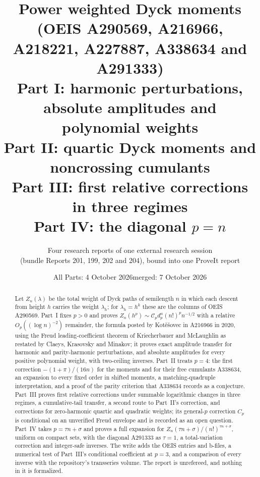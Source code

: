 \documentclass[11pt,letterpaper]{article}
\title{\LARGE\bfseries Power weighted Dyck moments\\[4pt]\large (OEIS A290569, A216966, A218221, A227887, A338634 and A291333)\\[8pt]
\normalsize Part I: harmonic perturbations, absolute amplitudes and polynomial weights\\[2pt]
Part II: quartic Dyck moments and noncrossing cumulants\\[2pt]
Part III: first relative corrections in three regimes\\[2pt]
Part IV: the diagonal $p=n$}
\author{Four research reports of one external research session\\(bundle Reports 201, 199, 202 and 204), bound into one ProveIt report}
\date{All Parts: 4 October 2026\quad merged: 7 October 2026}
\numberwithin{equation}{section}
\theoremstyle{remark}\newtheorem{remark}[theorem]{Remark}
\begin{document}
\hypersetup{pageanchor=false}
\maketitle
\begin{abstract}
Let $Z_n(\lambda)$ be the total weight of Dyck paths of semilength $n$ in which each descent from height $h$ carries the weight $\lambda_h$; for $\lambda_h=h^k$ these are the columns of OEIS A290569. Part~I fixes $p>0$ and proves $Z_n(h^p)\sim\mathcal C_pd_p^n(n!)^pn^{-1/2}$ with a relative $O_p((\log n)^{-2})$ remainder, the formula posted by Kot\v e\v sovec in A216966 in 2020, using the Freud leading-coefficient theorem of Kriecherbauer and McLaughlin as restated by Claeys, Krasovsky and Minakov; it proves exact amplitude transfer for harmonic and parity-harmonic perturbations, and absolute amplitudes for every positive polynomial weight, with two-ceiling inverses. Part~II treats $p=4$: the first correction $-(1+\pi)/(16n)$ for the moments and for their free cumulants A338634, an expansion to every fixed order in shifted moments, a matching-quadruple interpretation, and a proof of the parity criterion that A338634 records as a conjecture. Part~III proves first relative corrections under summable logarithmic changes in three regimes, a cumulative-tail transfer, a second route to Part~II's correction, and corrections for zero-harmonic quartic and quadratic weights; its general-$p$ correction $C_p$ is conditional on an unverified Freud envelope and is recorded as an open question. Part~IV takes $p=\tau n+\sigma$ and proves a full expansion for $Z_n(\tau n+\sigma)/(n!)^{\tau n+\sigma}$, uniform on compact sets, with the diagonal A291333 as $\tau=1$, a total-variation correction and integer-safe inverses. The write adds the OEIS entries and b-files, a numerical test of Part~III's conditional coefficient at $p=3$, and a comparison of every inverse with the repository's transseries volume. The report is unrefereed, and nothing in it is formalized.
\end{abstract}
\hypersetup{pageanchor=true}
{\small\setcounter{tocdepth}{1}\setlength{\parskip}{0pt}\tableofcontents}
\newpage
\end{document}
